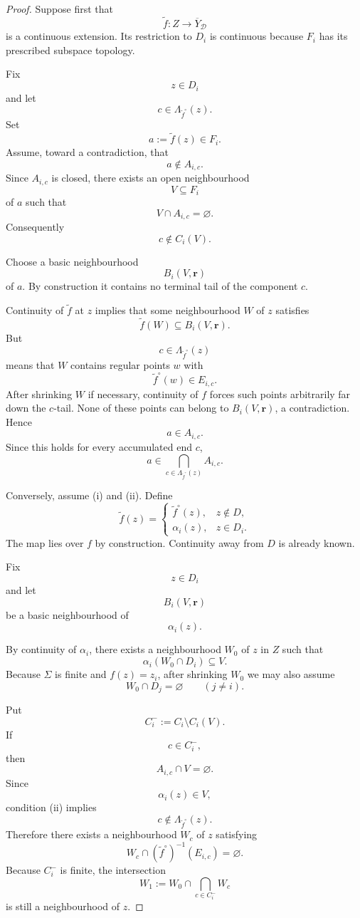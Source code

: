 \documentclass[11pt]{article}
\theoremstyle{plain}
\theoremstyle{definition}
\begin{document}
\begin{proof}
Suppose first that
\[
\widetilde f:Z\to\overline Y_{\mathcal D}
\]
is a continuous extension.  Its restriction to $D_i$ is continuous
because $F_i$ has its prescribed subspace topology.

Fix
\[
z\in D_i
\]
and let
\[
c\in\Lambda_{\widetilde f^\circ}(z).
\]
Set
\[
a:=\widetilde f(z)\in F_i.
\]
Assume, toward a contradiction, that
\[
a\notin A_{i,c}.
\]
Since $A_{i,c}$ is closed, there exists an open neighbourhood
\[
V\subseteq F_i
\]
of $a$ such that
\[
V\cap A_{i,c}=\varnothing.
\]
Consequently
\[
c\notin C_i(V).
\]

Choose a basic neighbourhood
\[
B_i(V,\mathbf r)
\]
of $a$.  By construction it contains no terminal tail of the component
$c$.

Continuity of $\widetilde f$ at $z$ implies that some neighbourhood
$W$ of $z$ satisfies
\[
\widetilde f(W)
\subseteq
B_i(V,\mathbf r).
\]
But
\[
c\in\Lambda_{\widetilde f^\circ}(z)
\]
means that $W$ contains regular points $w$ with
\[
\widetilde f^\circ(w)\in E_{i,c}.
\]
After shrinking $W$ if necessary, continuity of $f$ forces such points
arbitrarily far down the $c$-tail.  None of these points can belong to
$B_i(V,\mathbf r)$, a contradiction.  Hence
\[
a\in A_{i,c}.
\]
Since this holds for every accumulated end $c$,
\[
a\in
\bigcap_{c\in\Lambda_{\widetilde f^\circ}(z)}
A_{i,c}.
\]

Conversely, assume (i) and (ii).  Define
\[
\widetilde f(z)
=
\begin{cases}
\widetilde f^\circ(z),
&
z\notin D,
\\[1mm]
\alpha_i(z),
&
z\in D_i.
\end{cases}
\]
The map lies over $f$ by construction.  Continuity away from $D$ is
already known.

Fix
\[
z\in D_i
\]
and let
\[
B_i(V,\mathbf r)
\]
be a basic neighbourhood of
\[
\alpha_i(z).
\]

By continuity of $\alpha_i$, there exists a neighbourhood $W_0$ of $z$
in $Z$ such that
\[
\alpha_i(W_0\cap D_i)\subseteq V.
\]
Because $\Sigma$ is finite and $f(z)=z_i$, after shrinking $W_0$ we may also
assume
\[
W_0\cap D_j=\varnothing
\qquad (j\neq i).
\]

Put
\[
C_i^-:=C_i\setminus C_i(V).
\]
If
\[
c\in C_i^-,
\]
then
\[
A_{i,c}\cap V=\varnothing.
\]
Since
\[
\alpha_i(z)\in V,
\]
condition (ii) implies
\[
c\notin\Lambda_{\widetilde f^\circ}(z).
\]
Therefore there exists a neighbourhood $W_c$ of $z$ satisfying
\[
W_c\cap
(\widetilde f^\circ)^{-1}(E_{i,c})
=
\varnothing.
\]
Because $C_i^-$ is finite, the intersection
\[
W_1
:=
W_0\cap
\bigcap_{c\in C_i^-}W_c
\]
is still a neighbourhood of $z$.


\end{proof}
\end{document}
